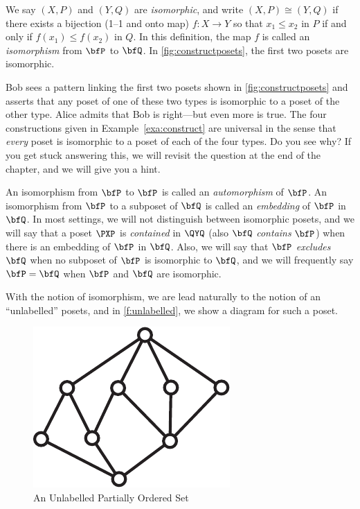 We say $(X,P)$ and $(Y,Q)$ are \textit{isomorphic}, and write $(X,P)
\cong(Y,Q)$ if there exists a bijection (1--1 and
onto map) $f:X\to Y$ so that $x_1\le x_2$ in $P$ if and only if
$f(x_1)\le f(x_2)$ in $Q$. In this definition, the map $f$ is called an
\textit{isomorphism} from $\bfP$ to $\bfQ$.  In \autoref{fig:constructposets},
the first two posets are isomorphic.

\begin{remark}  Bob sees a pattern linking the first two posets
shown in \autoref{fig:constructposets} and asserts that any poset of one of these
two types is isomorphic to a poset of the other type.  Alice admits that Bob
is right---but even more is true.  The four constructions given in 
Example~\ref{exa:construct} are universal in the sense that \textit{every}
poset is isomorphic to a poset of each of the four types.  Do you see why? 
If you get stuck answering this, we will revisit the question at the
end of the chapter, and we will give you a hint.
\end{remark}

An isomorphism from $\bfP$ to 
$\bfP$ is called an \textit{automorphism} of $\bfP$. An isomorphism from 
$\bfP$ to a subposet of $\bfQ$ is called an \textit{embedding} of
$\bfP$ in $\bfQ$. In most settings, we will not distinguish between
isomorphic posets, and we will say that a poset $\PXP$ is \textit{contained}
in $\QYQ$ (also $\bfQ$ \textit{contains} $\bfP$) when there is an
embedding of $\bfP$ in $\bfQ$. Also, we will say that $\bfP$ \textit{excludes}
$\bfQ$ when no subposet of $\bfP$ is isomorphic to $\bfQ$, and we will 
frequently say $\bfP=\bfQ$ when $\bfP$ and $\bfQ$ are isomorphic.

With the notion of isomorphism, we are lead naturally to the notion of
an ``unlabelled'' posets, and in \autoref{f:unlabelled}, we show a
diagram for such a poset.

\begin{figure}[hb]
\begin{center}
\includegraphics*[scale=.4]{posets-figs/wttfig-5.pdf}
\caption{\label{f:unlabelled}\sc An Unlabelled Partially Ordered Set}
\end{center}
\end{figure}

